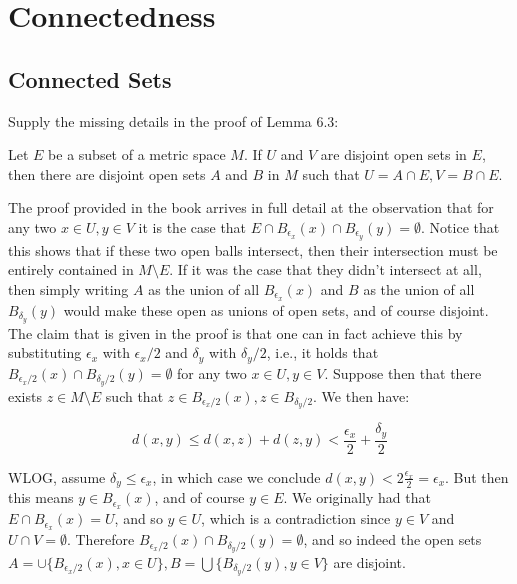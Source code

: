 \chapter{Connectedness}

\section{Connected Sets}

\begin{exercise}{1}
    Supply the missing details in the proof of Lemma 6.3:

    Let $E$ be a subset of a metric space $M$.
    If $U$ and $V$ are disjoint open sets in $E$, then there are disjoint open sets $A$ and $B$ in $M$ such that $U = A \cap E, V = B \cap E$.
\end{exercise}

\begin{solution}
    
    The proof provided in the book arrives in full detail at the observation that for any two $x \in U, y \in V$ it is the case that $E \cap B_{\epsilon_x}(x) \cap B_{\epsilon_y}(y) = \emptyset$.
    Notice that this shows that if these two open balls intersect, then their intersection must be entirely contained in $M \setminus E$.
    If it was the case that they didn't intersect at all, then simply writing $A$ as the union of all $B_{\epsilon_x}(x)$ and $B$ as the union of all $B_{\delta_y}(y)$ would make these open as unions of open sets, and of course disjoint.
    The claim that is given in the proof is that one can in fact achieve this by substituting $\epsilon_x$ with $\epsilon_x/2$ and $\delta_y$ with $\delta_y/2$, i.e., it holds that $B_{\epsilon_x/2}(x) \cap B_{\delta_y/2}(y) = \emptyset$ for any two $x \in U, y \in V$.
    Suppose then that there exists $z \in M \setminus E$ such that $z \in B_{\epsilon_x/2}(x), z \in B_{\delta_y/2}$.
    We then have:

    \[d(x, y) \leq d(x, z) + d(z, y) < \frac{\epsilon_x}{2} + \frac{\delta_y}{2}\]

    WLOG, assume $\delta_y \leq \epsilon_x$, in which case we conclude $d(x, y) < 2\frac{\epsilon_x}{2} = \epsilon_x$.
    But then this means $y \in B_{\epsilon_x}(x)$, and of course $y \in E$.
    We originally had that $E \cap B_{\epsilon_x}(x) = U$, and so $y \in U$, which is a contradiction since $y \in V$ and $U \cap V = \emptyset$.
    Therefore $B_{\epsilon_x/2}(x) \cap B_{\delta_y/2}(y) = \emptyset$, and so indeed the open sets $A = \cup \{B_{\epsilon_x/2}(x), x \in U\}, B = \bigcup \{B_{\delta_y/2}(y), y \in V\}$ are disjoint.
\end{solution}

